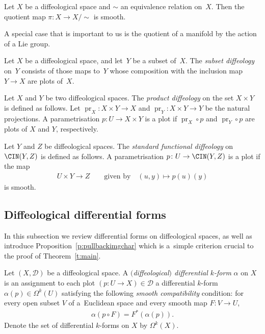 \begin{Remark}
Let $X$ be a dif\/feological space and $\sim$ an equivalence relation on~$X$.
Then the quotient map $\pi \colon X \to X / \!\!\sim$ is smooth.
\end{Remark}

A special case that is important to us is the quotient
of a manifold by the action of a Lie group.

\begin{Definition}
Let $X$ be a dif\/feological space, and let~$Y$ be a subset
of~$X$. The \emph{subset diffeology} on~$Y$ consists
of those maps to~$Y$ whose composition with the inclusion map $Y \to X$
are plots of~$X$.
\end{Definition}

\begin{Definition}
Let $X$ and $Y$ be two dif\/feological spaces.
The \emph{product diffeology} on the set $X \times Y$ is def\/ined as follows.
Let $\operatorname{pr}_X \colon X \times Y \to X$
and $\operatorname{pr}_Y \colon X \times Y \to Y$ be the natural projections.
A parametrisation $p \colon U \to X \times Y$ is a plot
if $\operatorname{pr}_X \circ p$ and $\operatorname{pr}_Y \circ p$
are plots of $X$ and $Y$, respectively.
\end{Definition}

\begin{Definition}
\label{d:functional}
Let $Y$ and $Z$ be dif\/feological spaces.
The \emph{standard functional diffeology} on $\CIN(Y,Z)$ is def\/ined as follows.
A parametrisation $p \colon U \to \CIN(Y,Z)$ is a plot if the map
 \begin{gather*} U \times Y\to Z \qquad \text{given by} \quad (u,y)\mapsto p(u)(y) \end{gather*}
is smooth.
\end{Definition}

\subsection*{Dif\/feological dif\/ferential forms}

In this subsection we review dif\/ferential forms on dif\/feological spaces, as well as introduce Proposition~\ref{p:pullbackimgchar} which is a~simple criterion crucial to the proof of Theorem~\ref{t:main}.

\begin{Definition}
\label{d:diff forms}
Let $(X,\mathcal{D})$ be a dif\/feological space.
A \emph{$($diffeological$)$ differential $k$-form} $\alpha$ on $X$
is an assignment to each plot $( p \colon U \to X) \in \mathcal{D}$
a dif\/ferential $k$-form $\alpha(p) \in \Omega^k(U)$
satisfying the following \emph{smooth compatibility} condition:
for every open subset $V$ of a~Euclidean space
and every smooth map $F \colon V \to U$,
\begin{gather*} \alpha(p\circ F) = F^* (\alpha(p)) .\end{gather*}
Denote the set of dif\/ferential $k$-forms on $X$ by $\Omega^k(X)$.
\end{Definition}

